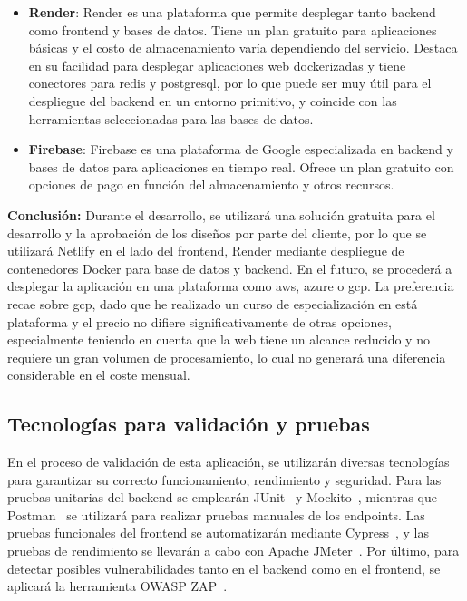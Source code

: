 \begin{itemize}
    \item \textbf{Render\cite{render-ref}}: Render es una plataforma que permite desplegar tanto \gls{backend} como \gls{frontend} y bases de datos. Tiene un plan gratuito para aplicaciones básicas y el costo de almacenamiento varía dependiendo del servicio. Destaca en su facilidad para desplegar aplicaciones web dockerizadas y tiene conectores para \gls{redis} y \gls{postgresql}, por lo que puede ser muy útil para el despliegue del backend en un entorno primitivo, y coincide con las herramientas seleccionadas para las bases de datos.
    
    \item \textbf{Firebase\cite{firebase-ref}}: Firebase es una plataforma de Google especializada en \gls{backend} y bases de datos para aplicaciones en tiempo real. Ofrece un plan gratuito con opciones de pago en función del almacenamiento y otros recursos.
\end{itemize}


\textbf{Conclusión:} Durante el desarrollo, se utilizará una solución gratuita para el desarrollo y la aprobación de los diseños por parte del cliente, por lo que se utilizará Netlify en el lado del \gls{frontend}, Render mediante despliegue de contenedores Docker para base de datos y \gls{backend}. En el futuro, se procederá a desplegar la aplicación en una plataforma como \gls{aws}, \gls{azure} o \gls{gcp}. La preferencia recae sobre \gls{gcp}, dado que he realizado un curso de especialización en está plataforma y el precio no difiere significativamente de otras opciones, especialmente teniendo en cuenta que la web tiene un alcance reducido y no requiere un gran volumen de procesamiento, lo cual no generará una diferencia considerable en el coste mensual.

\subsection{Tecnologías para validación y pruebas}
En el proceso de validación de esta aplicación, se utilizarán diversas tecnologías para garantizar su correcto funcionamiento, rendimiento y seguridad. Para las pruebas unitarias del \gls{backend} se emplearán JUnit~\cite{junit:web} y Mockito~\cite{mockito:web}, mientras que Postman~\cite{postman:web} se utilizará para realizar pruebas manuales de los endpoints. Las pruebas funcionales del \gls{frontend} se automatizarán mediante Cypress~\cite{cypress:web}, y las pruebas de rendimiento se llevarán a cabo con Apache JMeter~\cite{jmeter:web}. Por último, para detectar posibles vulnerabilidades tanto en el \gls{backend} como en el \gls{frontend}, se aplicará la herramienta OWASP ZAP~\cite{owasp-zap:web}.

